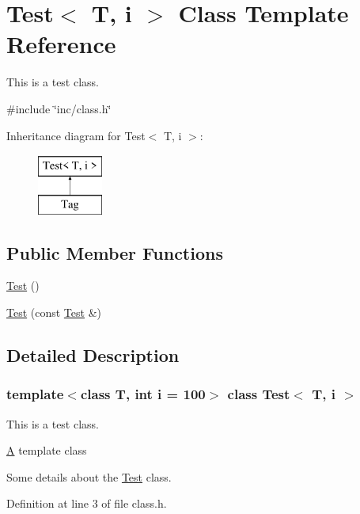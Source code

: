 \hypertarget{class_test}{}\section{Test$<$ T, i $>$ Class Template Reference}
\label{class_test}


This is a test class.  




{\ttfamily \#include \char`\"{}inc/class.\+h\char`\"{}}

Inheritance diagram for Test$<$ T, i $>$\+:\begin{figure}[H]
\begin{center}
\leavevmode
\includegraphics[height=2.000000cm]{class_test}
\end{center}
\end{figure}
\subsection*{Public Member Functions}
\begin{DoxyCompactItemize}
\item 
\hyperlink{class_test_a350e5417b9f48c2f7b98937514b03da2}{Test} ()
\item 
\hyperlink{class_test_ae2651dabc71308c432448f45a2738ace}{Test} (const \hyperlink{class_test}{Test} \&)
\end{DoxyCompactItemize}


\subsection{Detailed Description}
\subsubsection*{template$<$class T, int i = 100$>$\newline
class Test$<$ T, i $>$}

This is a test class. 

\hyperlink{class_a}{A} template class

Some details about the \hyperlink{class_test}{Test} class. 

Definition at line 3 of file class.\+h.



